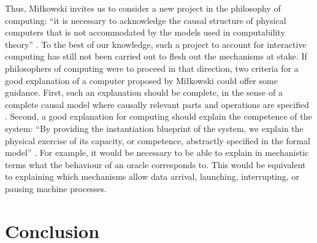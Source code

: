 \documentclass[a4paper, 11pt, twoside]{article}
\begin{document}
Thus, Miłkowski invites us to consider a new project in the philosophy of computing: ``it is necessary to acknowledge the causal structure of physical computers that is not accommodated by the models used in computability theory'' \parencite{Mikowski2011}. To the best of our knowledge, such a project to account for interactive computing has still not been carried out to flesh out the mechanisms at stake. If philosophers of computing were to proceed in that direction, two criteria for a good explanation of a computer proposed by Miłkowski could offer some guidance. First, such an explanation should be complete, in the sense of a complete causal model where causally relevant parts and operations are specified \parencite{Mikowski2014}. Second, a good explanation for computing should explain the competence of the system: ``By providing the instantiation blueprint of the system, we explain the physical exercise of its capacity, or competence, abstractly specified in the formal model'' \parencite{Mikowski2014}. For example, it would be necessary to be able to explain in mechanistic terms what the behaviour of an oracle corresponds to. This would be equivalent to explaining which mechanisms allow data arrival, launching, interrupting, or pausing machine processes.

\section*{Conclusion} 
\end{document}
